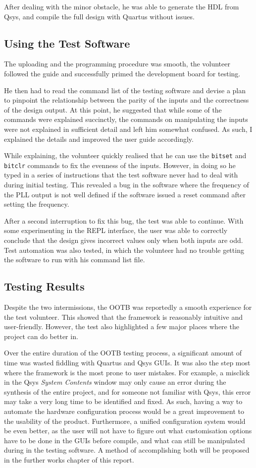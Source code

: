 After dealing with the minor obstacle, he was able to generate the HDL from Qsys, and compile the full design with Quartus without issues.

\subsection{Using the Test Software}
The uploading and the programming procedure was smooth, the volunteer followed the guide and successfully primed the development board for testing.

He then had to read the command list of the testing software and devise a plan to pinpoint the relationship between the parity of the inputs and the correctness of the design output.
At this point, he suggested that while some of the commands were explained succinctly, the commands on manipulating the inputs were not explained in sufficient detail and left him somewhat confused.
As such, I explained the details and improved the user guide accordingly.

While explaining, the volunteer quickly realised that he can use the \texttt{bitset} and \texttt{bitclr} commands to fix the evenness of the inputs.
However, in doing so he typed in a series of instructions that the test software never had to deal with during initial testing.
This revealed a bug in the software where the frequency of the PLL output is not well defined if the software issued a reset command after setting the frequency.

After a second interruption to fix this bug, the test was able to continue.
With some experimenting in the REPL interface, the user was able to correctly conclude that the design gives incorrect values only when both inputs are odd.
Test automation was also tested, in which the volunteer had no trouble getting the software to run with his command list file.

\subsection{Testing Results}
Despite the two intermissions, the OOTB was reportedly a smooth experience for the test volunteer.
This showed that the framework is reasonably intuitive and user-friendly.
However, the test also highlighted a few major places where the project can do better in.

Over the entire duration of the OOTB testing process, a significant amount of time was wasted fiddling with Quartus and Qsys GUIs.
It was also the step most where the framework is the most prone to user mistakes.
For example, a misclick in the Qsys \textit{System Contents} window may only cause an error during the synthesis of the entire project, and for someone not familiar with Qsys, this error may take a very long time to be identified and fixed.
As such, having a way to automate the hardware configuration process would be a great improvement to the usability of the product.
Furthermore, a unified configuration system would be even better, as the user will not have to figure out what customisation options have to be done in the GUIs before compile, and what can still be manipulated during in the testing software.
A method of accomplishing both will be proposed in the further works chapter of this report.


